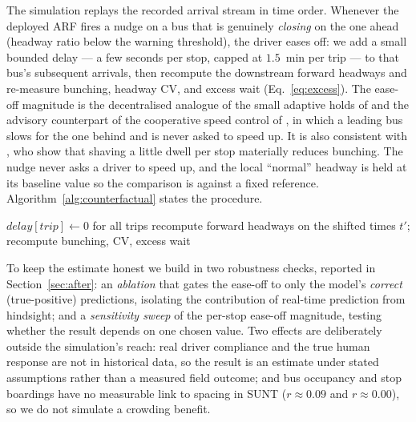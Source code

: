 \documentclass[final,5p,times,twocolumn,authoryear]{elsarticle}
\begin{document}
The simulation replays the recorded arrival stream in time order. Whenever the deployed ARF fires a
nudge on a bus that is genuinely \emph{closing} on the one ahead (headway ratio below the warning
threshold), the driver eases off: we add a small bounded delay --- a few seconds per stop, capped at
$1.5$~min per trip --- to that bus's subsequent arrivals, then recompute the downstream forward
headways and re-measure bunching, headway $\mathrm{CV}$, and excess wait (Eq.~\ref{eq:excess}). The
ease-off magnitude is the decentralised analogue of the small adaptive holds of \citet{Daganzo2009}
and the advisory counterpart of the cooperative speed control of \citet{DaganzoPilachowski2011}, in
which a leading bus slows for the one behind and is never asked to speed up. It is also consistent
with \citet{Enayatollahi2019}, who show that shaving a little dwell per stop materially reduces
bunching. The nudge never asks a driver to speed up, and the local ``normal'' headway is held at its
baseline value so the comparison is against a fixed reference.
Algorithm~\ref{alg:counterfactual} states the procedure.

\begin{algorithm*}[t]
\footnotesize
\DontPrintSemicolon
{}
\BlankLine
$\textit{delay}[\textit{trip}] \leftarrow 0$ for all trips\;
recompute forward headways on the shifted times $t'$; recompute bunching, CV, excess wait\;
\caption{Counterfactual ease-off replay (simulation).}
\label{alg:counterfactual}
\end{algorithm*}

To keep the estimate honest we build in two robustness checks, reported in Section~\ref{sec:after}:
an \emph{ablation} that gates the ease-off to only the model's \emph{correct} (true-positive)
predictions, isolating the contribution of real-time prediction from hindsight; and a
\emph{sensitivity sweep} of the per-stop ease-off magnitude, testing whether the result depends on
one chosen value. Two effects are deliberately outside the simulation's reach: real driver compliance
and the true human response are not in historical data, so the result is an estimate under stated
assumptions rather than a measured field outcome; and bus occupancy and stop boardings have no
measurable link to spacing in SUNT ($r\approx0.09$ and $r\approx0.00$), so we do not simulate a
crowding benefit.
\end{document}
